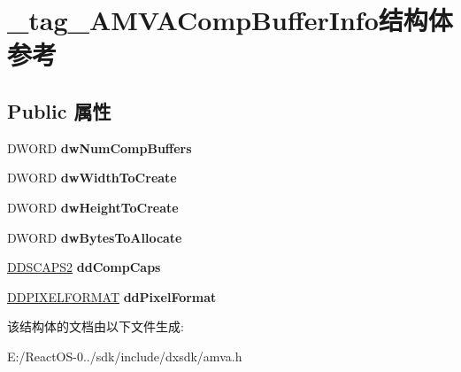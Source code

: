 \hypertarget{struct__tag___a_m_v_a_comp_buffer_info}{}\section{\+\_\+tag\+\_\+\+A\+M\+V\+A\+Comp\+Buffer\+Info结构体 参考}
\label{struct__tag___a_m_v_a_comp_buffer_info}
\subsection*{Public 属性}
\begin{DoxyCompactItemize}
\item 
\mbox{\label{struct__tag___a_m_v_a_comp_buffer_info_a46b3ed9f3cc7beba10fec439e2764b8b}} 
D\+W\+O\+RD {\bfseries dw\+Num\+Comp\+Buffers}
\item 
\mbox{\label{struct__tag___a_m_v_a_comp_buffer_info_adb4dd0c36463e333e1a092a020cbf32f}} 
D\+W\+O\+RD {\bfseries dw\+Width\+To\+Create}
\item 
\mbox{\label{struct__tag___a_m_v_a_comp_buffer_info_a5f875baf664d029f3c4f16f8314fbbf4}} 
D\+W\+O\+RD {\bfseries dw\+Height\+To\+Create}
\item 
\mbox{\label{struct__tag___a_m_v_a_comp_buffer_info_a98249bf6f8c1582a1e72a273fec3848d}} 
D\+W\+O\+RD {\bfseries dw\+Bytes\+To\+Allocate}
\item 
\mbox{\label{struct__tag___a_m_v_a_comp_buffer_info_aaa709d883820adeae1f5ea5d8fcad39a}} 
\hyperlink{struct___d_d_s_c_a_p_s2}{D\+D\+S\+C\+A\+P\+S2} {\bfseries dd\+Comp\+Caps}
\item 
\mbox{\label{struct__tag___a_m_v_a_comp_buffer_info_af17e72a4f07d4fd6592236dfcd383902}} 
\hyperlink{struct___d_d_p_i_x_e_l_f_o_r_m_a_t}{D\+D\+P\+I\+X\+E\+L\+F\+O\+R\+M\+AT} {\bfseries dd\+Pixel\+Format}
\end{DoxyCompactItemize}


该结构体的文档由以下文件生成\+:\begin{DoxyCompactItemize}
\item 
E\+:/\+React\+O\+S-\/0../sdk/include/dxsdk/amva.\+h\end{DoxyCompactItemize}
